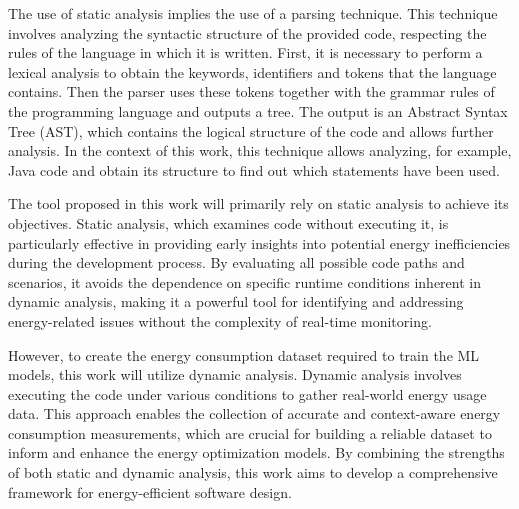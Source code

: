The use of static analysis implies the use of a parsing technique. This technique involves analyzing the syntactic structure of the provided code, respecting the rules of the language in which it is written. First, it is necessary to perform a lexical analysis to obtain the keywords, identifiers and tokens that the language contains. Then the parser uses these tokens together with the grammar rules of the programming language and outputs a tree. The output is an Abstract Syntax Tree (AST), which contains the logical structure of the code and allows further analysis. In the context of this work, this technique allows analyzing, for example, Java code and obtain its structure to find out which statements have been used.


The tool proposed in this work will primarily rely on static analysis to achieve its objectives. Static analysis, which examines code without executing it, is particularly effective in providing early insights into potential energy inefficiencies during the development process. By evaluating all possible code paths and scenarios, it avoids the dependence on specific runtime conditions inherent in dynamic analysis, making it a powerful tool for identifying and addressing energy-related issues without the complexity of real-time monitoring.

However, to create the energy consumption dataset required to train the ML models, this work will utilize dynamic analysis. Dynamic analysis involves executing the code under various conditions to gather real-world energy usage data. This approach enables the collection of accurate and context-aware energy consumption measurements, which are crucial for building a reliable dataset to inform and enhance the energy optimization models. By combining the strengths of both static and dynamic analysis, this work aims to develop a comprehensive framework for energy-efficient software design.

